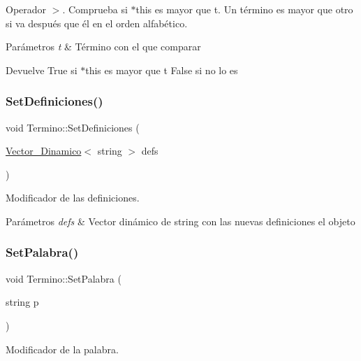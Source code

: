 Operador $>$. Comprueba si $\ast$this es mayor que t. Un término es mayor que otro si va después que él en el orden alfabético. 


\begin{DoxyParams}{Parámetros}
{\em t} & Término con el que comparar \\
\hline
\end{DoxyParams}
\begin{DoxyReturn}{Devuelve}
True si $\ast$this es mayor que t False si no lo es 
\end{DoxyReturn}
\mbox{\label{classTermino_a21589c6c6bac237c8ec47e62a5d21c07}} 
\subsubsection{\texorpdfstring{SetDefiniciones()}{SetDefiniciones()}}
{\footnotesize\ttfamily void Termino\+::\+Set\+Definiciones (\begin{DoxyParamCaption}\item[{\mbox{\hyperlink{classVector__Dinamico}{Vector\+\_\+\+Dinamico}}$<$ string $>$}]{defs }\end{DoxyParamCaption})}



Modificador de las definiciones. 


\begin{DoxyParams}{Parámetros}
{\em defs} & Vector dinámico de string con las nuevas definiciones el objeto \\
\hline
\end{DoxyParams}
\mbox{\label{classTermino_a3a630930f55cbaf5795ba04c54e00534}} 
\subsubsection{\texorpdfstring{SetPalabra()}{SetPalabra()}}
{\footnotesize\ttfamily void Termino\+::\+Set\+Palabra (\begin{DoxyParamCaption}\item[{string}]{p }\end{DoxyParamCaption})}



Modificador de la palabra. 


